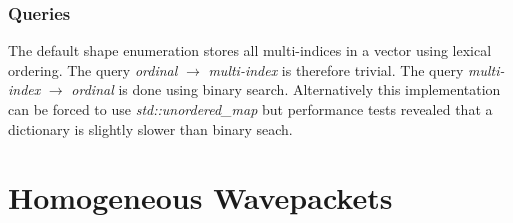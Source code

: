 \documentclass{article}
\begin{document}
\subsubsection{Queries}
The default shape enumeration stores all multi-indices in a vector using lexical ordering. The query \emph{ordinal} \(\rightarrow\) \emph{multi-index} is therefore trivial. The query \emph{multi-index} \(\rightarrow\) \emph{ordinal} is done using binary search. Alternatively this implementation can be forced to use \emph{std::unordered\_map} but performance tests revealed that a dictionary is slightly slower than binary seach.

\section{Homogeneous Wavepackets}
\end{document}
